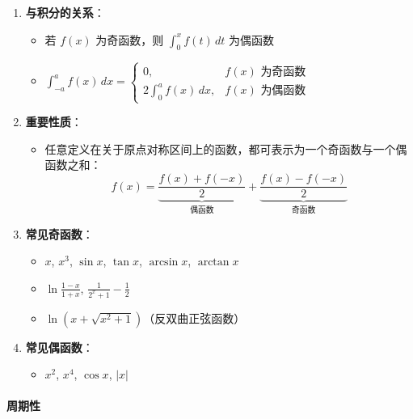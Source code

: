 \documentclass[../book.tex]{subfiles}
\begin{document}
\begin{enumerate}
        \item \textbf{与积分的关系}：
        \begin{itemize}
            \item 若 $f(x)$ 为奇函数，则 $\int_0^x f(t)\,dt$ 为偶函数
            \item $\int_{-a}^{a} f(x)\,dx = \begin{cases}
                                                0, & f(x) \text{ 为奇函数} \\ 2\int_0^a f(x)\,dx, & f(x) \text{ 为偶函数}
            \end{cases}$
        \end{itemize}

        \item \textbf{重要性质}：
        \begin{itemize}
            \item 任意定义在关于原点对称区间上的函数，都可表示为一个奇函数与一个偶函数之和：
            \[
                f(x) = \underbrace{\frac{f(x) + f(-x)}{2}}_{\text{偶函数}} + \underbrace{\frac{f(x) - f(-x)}{2}}_{\text{奇函数}}
            \]
        \end{itemize}

        \item \textbf{常见奇函数}：
        \begin{itemize}
            \item $x$, $x^3$, $\sin x$, $\tan x$, $\arcsin x$, $\arctan x$
            \item $\ln\displaystyle\frac{1-x}{1+x}$, $\displaystyle\frac{1}{2^x + 1} - \frac{1}{2}$
            \item $\ln(x + \sqrt{x^2 + 1})$（反双曲正弦函数）
        \end{itemize}

        \item \textbf{常见偶函数}：
        \begin{itemize}
            \item $x^2$, $x^4$, $\cos x$, $|x|$
        \end{itemize}
    \end{enumerate}

    \paragraph{周期性}
\end{document}
